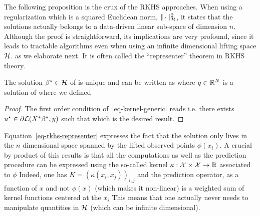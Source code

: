 The following proposition is the crux of the RKHS approaches. When using a regularization which is a squared Euclidean norm, $|\!| \cdot |\!|_{\mathcal{H}}^2$, it states that the solutions actually belongs to a data-driven linear sub-space of dimension $n$. Although the proof is straightforward, its implications are very profound, since it leads to tractable algorithms even when using an infinite dimensional lifting space $\mathcal{H}$. as we elaborate next. It is often called the ``representer'' theorem in RKHS theory. 

\begin{prop}
	The solution $\beta^\star \in \mathcal{H}$ of
	is unique and can be written as
	where $q \in \mathbb{R}^N$ is a solution of
	where we defined 
\end{prop}

\begin{proof}
	The first order condition of~\eqref{eq-kernel-generic} reads
	i.e. there exists $u^\star \in \partial \mathcal{L}(\bar X^* \beta^\star,y)$ such that 
	which is the desired result. 
\end{proof} 

Equation~\eqref{eq-rkhs-representer} expresses the fact that the solution only lives in the $n$ dimensional space spanned by the lifted observed points $\phi(x_i)$.
%
A crucial by product of this results is that all the computations as well as the prediction procedure can be expressed using the so-called kernel $\kappa : \mathcal{X} \times \mathcal{X} \rightarrow \mathbb{R}$ associated to $\phi$
Indeed, one has $K = (\kappa(x_i,x_j))_{i,j}$ and the prediction operator, as a function of $x$ and not $\phi(x)$ (which makes it non-linear) is a weighted sum of kernel functions centered at the $x_i$
This means that one actually never needs to manipulate quantities in $\mathcal{H}$ (which can be infinite dimensional).

